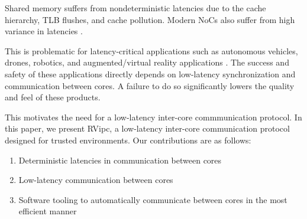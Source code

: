   Shared memory suffers from nondeterministic latencies due to the cache hierarchy, TLB flushes, and cache pollution. Modern NoCs also suffer from high variance in latencies \cite{LowLatencyVarianceNoCRouter}.

  This is problematic for latency-critical applications such as autonomous vehicles, drones, robotics, and augmented/virtual reality applications \cite{Elbamby:VR:2018}. The success and safety of these applications directly depends on low-latency synchronization and communication between cores. A failure to do so significantly lowers the quality and feel of these products. 

  This motivates the need for a low-latency inter-core commmunication protocol. In this paper, we present RVipc, a low-latency inter-core communication protocol designed for trusted environments. Our contributions are as follows:

  \begin{enumerate}
    \item Deterministic latencies in communication between cores
    \item Low-latency communication between cores 
    \item Software tooling to automatically communicate between cores in the most efficient manner
  \end{enumerate}
